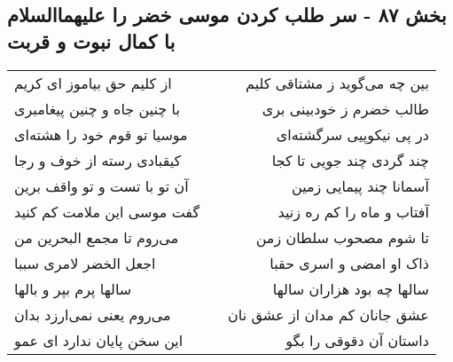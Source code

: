 \begin{center}
\section*{بخش ۸۷ - سر طلب کردن موسی خضر را علیهماالسلام با کمال نبوت و قربت}
\label{sec:sh087}
\begin{longtable}{l p{0.5cm} r}
از کلیم حق بیاموز ای کریم
&&
بین چه می‌گوید ز مشتاقی کلیم
\\
با چنین جاه و چنین پیغامبری
&&
طالب خضرم ز خودبینی بری
\\
موسیا تو قوم خود را هشته‌ای
&&
در پی نیکوپیی سرگشته‌ای
\\
کیقبادی رسته از خوف و رجا
&&
چند گردی چند جویی تا کجا
\\
آن تو با تست و تو واقف برین
&&
آسمانا چند پیمایی زمین
\\
گفت موسی این ملامت کم کنید
&&
آفتاب و ماه را کم ره زنید
\\
می‌روم تا مجمع البحرین من
&&
تا شوم مصحوب سلطان زمن
\\
اجعل الخضر لامری سببا
&&
ذاک او امضی و اسری حقبا
\\
سالها پرم بپر و بالها
&&
سالها چه بود هزاران سالها
\\
می‌روم یعنی نمی‌ارزد بدان
&&
عشق جانان کم مدان از عشق نان
\\
این سخن پایان ندارد ای عمو
&&
داستان آن دقوقی را بگو
\\
\end{longtable}
\end{center}
